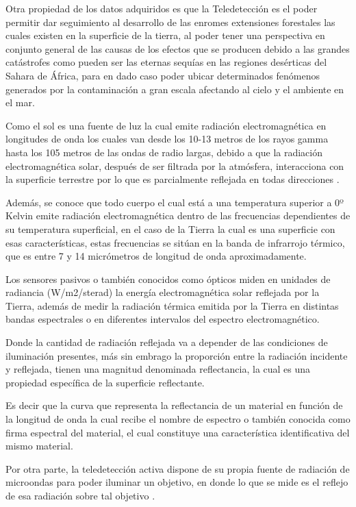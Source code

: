 Otra propiedad de los datos adquiridos es que la Teledetección es el poder permitir dar seguimiento al desarrollo de las enromes extensiones forestales las cuales existen en la superficie de la tierra, al poder tener una perspectiva en conjunto general de las causas de los efectos que se producen debido a las grandes catástrofes como pueden ser las eternas sequías en las regiones desérticas del Sahara de África, para en dado caso poder ubicar determinados fenómenos generados por la contaminación a gran escala afectando al cielo y el ambiente en el mar.

Como el sol es una fuente de luz la cual emite radiación electromagnética en longitudes de onda los cuales van desde los 10-13 metros de los rayos gamma hasta los 105 metros de las ondas de radio largas, debido a que la radiación electromagnética solar, después de ser filtrada por la atmósfera, interacciona con la superficie terrestre por lo que es parcialmente reflejada en todas direcciones \cite{MartiCardona2011}. 

Además, se conoce que todo cuerpo el cual está a una temperatura superior a 0º Kelvin emite radiación electromagnética dentro de las frecuencias dependientes de su temperatura superficial, en el caso de la Tierra la cual es una superficie con esas características, estas frecuencias se sitúan en la banda de infrarrojo térmico, que es entre 7 y 14 micrómetros de longitud de onda aproximadamente.

Los sensores pasivos o también conocidos como ópticos miden en unidades de radiancia (W/m2/sterad) la energía electromagnética solar reflejada por la Tierra, además de medir la radiación térmica emitida por la Tierra en distintas bandas espectrales o en diferentes intervalos del espectro electromagnético.

Donde la cantidad de radiación reflejada va a depender de las condiciones de iluminación presentes, más sin embrago la proporción entre la radiación incidente y reflejada, tienen una magnitud denominada reflectancia, la cual es una propiedad específica de la superficie reflectante.

Es decir que la curva que representa la reflectancia de un material en función de la longitud de onda la cual recibe el nombre de espectro o también conocida como firma espectral del material, el cual constituye una característica identificativa del mismo material.

Por otra parte, la teledetección activa dispone de su propia fuente de radiación de microondas para poder iluminar un objetivo, en donde lo que se mide es el reflejo de esa radiación sobre tal objetivo \cite{AcevoHerrera2011Apr}.

